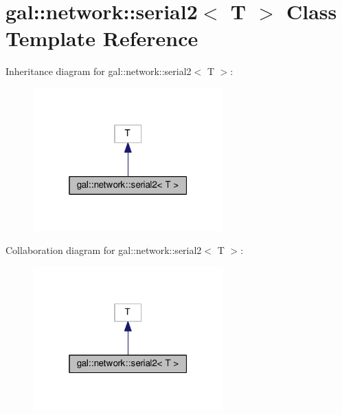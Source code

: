 \hypertarget{classgal_1_1network_1_1serial2}{\section{gal\-:\-:network\-:\-:serial2$<$ T $>$ Class Template Reference}
\label{classgal_1_1network_1_1serial2}
}


Inheritance diagram for gal\-:\-:network\-:\-:serial2$<$ T $>$\-:
\nopagebreak
\begin{figure}[H]
\begin{center}
\leavevmode
\includegraphics[width=208pt]{classgal_1_1network_1_1serial2__inherit__graph}
\end{center}
\end{figure}


Collaboration diagram for gal\-:\-:network\-:\-:serial2$<$ T $>$\-:
\nopagebreak
\begin{figure}[H]
\begin{center}
\leavevmode
\includegraphics[width=208pt]{classgal_1_1network_1_1serial2__coll__graph}
\end{center}
\end{figure}
